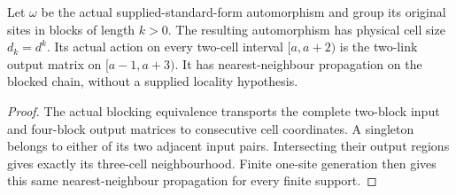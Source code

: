 \begin{lemma}
    \label{lem:mpu_actual_blocked_nearest_neighbour}
    \leanok
    Let $\omega$ be the actual supplied-standard-form automorphism and
    group its original sites in blocks of length $k>0$. The resulting
    automorphism has physical cell size $d_k=d^k$. Its actual action
    on every two-cell interval $[a,a+2)$ is the two-link output matrix
    on $[a-1,a+3)$. It has nearest-neighbour propagation on the blocked
    chain, without a supplied locality hypothesis.
\end{lemma}
\begin{proof}\leanok
    The actual blocking equivalence transports the complete two-block
    input and four-block output matrices to consecutive cell coordinates.
    A singleton belongs to either of its two adjacent input pairs.
    Intersecting their output regions gives exactly its three-cell
    neighbourhood. Finite one-site generation then gives this same
    nearest-neighbour propagation for every finite support.
\end{proof}

